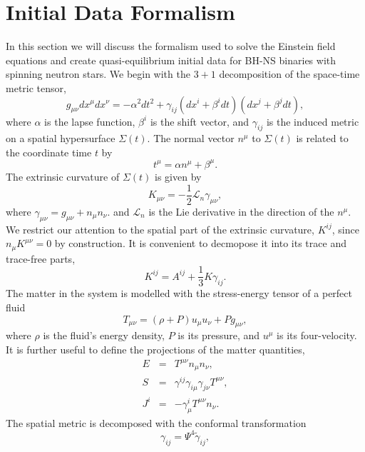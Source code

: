 \section{Initial Data Formalism}
In this section we will discuss the formalism used to solve the
Einstein field equations and create quasi-equilibrium initial data for
BH-NS binaries with spinning neutron
stars. We begin with the $3+1$ decomposition of the space-time metric
tensor,
\begin{equation}
g_{\mu\nu}dx^{\mu}dx^{\nu} = -\alpha^2dt^2 + \gamma_{ij}\left(dx^i +
  \beta^idt\right)\left(dx^j+\beta^jdt\right),
\end{equation}
where $\alpha$ is the lapse function, $\beta^i$ is the shift vector,
and $\gamma_{ij}$ is the induced metric on a spatial hypersurface
$\Sigma(t)$. The normal vector $n^{\mu}$ to $\Sigma(t)$ is related to
the coordinate time $t$ by
\begin{equation}
t^{\mu} = \alpha n^{\mu} + \beta^{\mu}.
\end{equation}
The extrinsic curvature of $\Sigma(t)$ is given by
\begin{equation}
K_{\mu\nu} = -\frac{1}{2}\mathcal{L}_n\gamma_{\mu\nu},
\end{equation}
where $\gamma_{\mu\nu}=g_{\mu\nu}+n_{\mu}n_{\nu}.$ and $\mathcal{L}_n$
is the Lie derivative in the direction of the $n^{\mu}$. We restrict our
attention to the spatial part of the extrinsic curvature, $K^{ij}$,
since $n_{\mu}K^{\mu\nu}=0$ by construction. It is convenient to
decmopose it into its trace and trace-free parts,
\begin{equation}
K^{ij} = A^{ij}+\frac{1}{3}K\gamma_{ij}.
\end{equation}
The matter in the system is modelled with the stress-energy tensor of
a perfect fluid 
\begin{equation}
T_{\mu\nu}=\left(\rho+P\right)u_{\mu}u_{\nu}+Pg_{\mu\nu},
\end{equation}
where $\rho$ is the fluid's energy density, $P$ is its pressure, and
$u^{\mu}$ is its four-velocity. It is further useful to define the
projections of the matter quantities,
\begin{eqnarray}
E &=& T^{\mu\nu}n_{\mu}n_{\nu},\\
S &=& \gamma^{ij}\gamma_{i\mu}\gamma_{j\nu}T^{\mu\nu}, \\
J^i &=& -\gamma^{i}_{\mu}T^{\mu\nu}n_{\nu}.
\end{eqnarray}
The spatial metric is decomposed with the conformal transformation
\begin{equation}
\gamma_{ij}=\Psi^4\tilde{\gamma}_{ij},
\end{equation}

